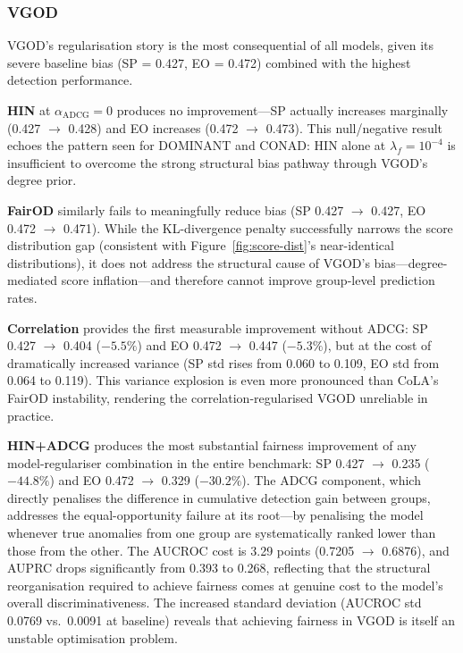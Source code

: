 \documentclass[sigconf,natbib=false]{acmart}
\begin{document}
\subsubsection{VGOD}

VGOD's regularisation story is the most consequential of all models, given its severe baseline bias (SP = 0.427, EO = 0.472) combined with the highest detection performance.

\textbf{HIN} at $\alpha_{\text{ADCG}} = 0$ produces no improvement—SP actually increases marginally (0.427 $\to$ 0.428) and EO increases (0.472 $\to$ 0.473). This null/negative result echoes the pattern seen for DOMINANT and CONAD: HIN alone at $\lambda_f = 10^{-4}$ is insufficient to overcome the strong structural bias pathway through VGOD's degree prior.

\textbf{FairOD} similarly fails to meaningfully reduce bias (SP 0.427 $\to$ 0.427, EO 0.472 $\to$ 0.471). While the KL-divergence penalty successfully narrows the score distribution gap (consistent with Figure~\ref{fig:score-dist}'s near-identical distributions), it does not address the structural cause of VGOD's bias—degree-mediated score inflation—and therefore cannot improve group-level prediction rates.

\textbf{Correlation} provides the first measurable improvement without ADCG: SP 0.427 $\to$ 0.404 ($-5.5\%$) and EO 0.472 $\to$ 0.447 ($-5.3\%$), but at the cost of dramatically increased variance (SP std rises from 0.060 to 0.109, EO std from 0.064 to 0.119). This variance explosion is even more pronounced than CoLA's FairOD instability, rendering the correlation-regularised VGOD unreliable in practice.

\textbf{HIN+ADCG} produces the most substantial fairness improvement of any model-regulariser combination in the entire benchmark: SP 0.427 $\to$ 0.235 ($-44.8\%$) and EO 0.472 $\to$ 0.329 ($-30.2\%$). The ADCG component, which directly penalises the difference in cumulative detection gain between groups, addresses the equal-opportunity failure at its root—by penalising the model whenever true anomalies from one group are systematically ranked lower than those from the other. The AUCROC cost is 3.29 points (0.7205 $\to$ 0.6876), and AUPRC drops significantly from 0.393 to 0.268, reflecting that the structural reorganisation required to achieve fairness comes at genuine cost to the model's overall discriminativeness. The increased standard deviation (AUCROC std 0.0769 vs.\ 0.0091 at baseline) reveals that achieving fairness in VGOD is itself an unstable optimisation problem.
\end{document}
